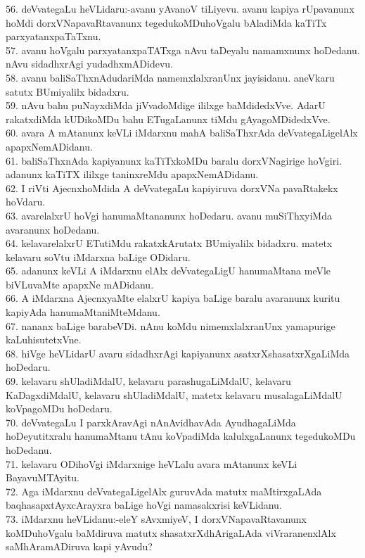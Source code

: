 \documentclass{article}
\begin{document}
56. deVvategaLu heVLidaru:-avanu yAvanoV tiLiyevu. avanu kapiya rUpavanunx hoMdi dorxVNapavaRtavanunx tegedukoMDuhoVgalu bAladiMda kaTiTx parxyatanxpaTaTxnu.\\
57. avanu hoVgalu parxyatanxpaTATxga nAvu taDeyalu namamxnunx hoDedanu. nAvu sidadhxrAgi yudadhxmADidevu.\\
58. avanu baliSaThxnAdudariMda namemxlalxranUnx jayisidanu. aneVkaru satutx BUmiyalilx bidadxru.\\
59. nAvu bahu puNayxdiMda jiVvadoMdige ililxge baMdidedxVve. AdarU rakatxdiMda kUDikoMDu bahu ETugaLanunx tiMdu gAyagoMDidedxVve.\\
60. avara A mAtanunx keVLi iMdarxnu mahA baliSaThxrAda deVvategaLigelAlx apapxNemADidanu.\\
61. baliSaThxnAda kapiyanunx kaTiTxkoMDu baralu dorxVNagirige hoVgiri. adanunx kaTiTX ililxge taninxreMdu apapxNemADidanu.\\
62. I riVti AjecnxhoMdida A deVvategaLu kapiyiruva dorxVNa pavaRtakekx hoVdaru.\\
63. avarelalxrU hoVgi hanumaMtananunx hoDedaru. avanu muSiThxyiMda avaranunx hoDedanu.\\
64. kelavarelalxrU ETutiMdu rakatxkArutatx BUmiyalilx bidadxru. matetx kelavaru soVtu iMdarxna baLige ODidaru.\\
65. adanunx keVLi A iMdarxnu elAlx deVvategaLigU hanumaMtana meVle biVLuvaMte apapxNe mADidanu.\\
66. A iMdarxna AjecnxyaMte elalxrU kapiya baLige baralu avaranunx kuritu kapiyAda hanumaMtaniMteMdanu.\\
67. nananx baLige barabeVDi. nAnu koMdu nimemxlalxranUnx yamapurige kaLuhisutetxVne.\\
68. hiVge heVLidarU avaru sidadhxrAgi kapiyanunx asatxrXshasatxrXgaLiMda hoDedaru.\\
69. kelavaru shUladiMdalU, kelavaru parashugaLiMdalU, kelavaru KaDagxdiMdalU, kelavaru shUladiMdalU, matetx kelavaru musalagaLiMdalU koVpagoMDu hoDedaru.\\
70. deVvategaLu I parxkAravAgi nAnAvidhavAda AyudhagaLiMda hoDeyutitxralu hanumaMtanu tAnu koVpadiMda kalulxgaLanunx tegedukoMDu hoDedanu.\\
71. kelavaru ODihoVgi iMdarxnige heVLalu avara mAtanunx keVLi BayavuMTAyitu.\\
72. Aga iMdarxnu deVvategaLigelAlx guruvAda matutx maMtirxgaLAda baqhasapxtAyxcArayxra baLige hoVgi namasakxrisi keVLidanu.\\
73. iMdarxnu heVLidanu:-eleY sAvxmiyeV, I dorxVNapavaRtavanunx koMDuhoVgalu baMdiruva matutx shasatxrXdhArigaLAda viVraranenxlAlx saMhAramADiruva kapi yAvudu?\\
\end{document}
